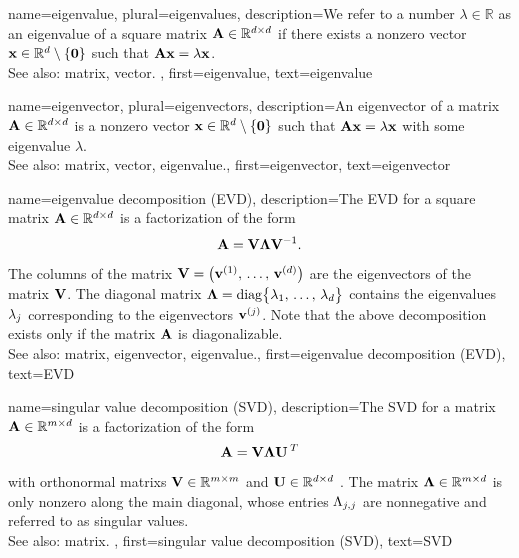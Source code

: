 {name={eigenvalue}, plural={eigenvalues}, 
	description={We refer to a 
		number $\lambda \in \mathbb{R}$ as an eigenvalue of a square \gls{matrix} $\mathbf{A} \in \mathbb{R}^{d \times d}$ 
		if there exists a nonzero \gls{vector} ${\bf x} \in \mathbb{R}^{d} \setminus \{ \mathbf{0} \}$ such that $\mathbf{A} {\bf x} = \lambda {\bf x}$.
		\\
		See also: \gls{matrix}, \gls{vector}. },
	first={eigenvalue},
	text={eigenvalue} 
}
	
{name={eigenvector}, plural={eigenvectors}, 
	description={An 
		eigenvector of a \gls{matrix} $\mathbf{A} \in \mathbb{R}^{d \times d}$ 
		is a nonzero \gls{vector} ${\bf x} \in \mathbb{R}^{d} \setminus \{ \mathbf{0} \}$ 
		such that $\mathbf{A} {\bf x} = \lambda {\bf x}$ with some \gls{eigenvalue} $\lambda$.
				\\
		See also: \gls{matrix}, \gls{vector}, \gls{eigenvalue}.},
	first={eigenvector},
	text={eigenvector} 
}

{name={eigenvalue decomposition (EVD)}, 
	description={The EVD
		for a square \gls{matrix} ${\bf A} \in \mathbb{R}^{d \times d}$ 
		is a factorization of the form 
		$${\bf A} = \mathbf{V} {\bm \Lambda} \mathbf{V}^{-1}.$$ 
		The columns of the \gls{matrix} $\mathbf{V} = \big( {\bf v}^{(1)}, \,\ldots, \,{\bf v}^{(d)} \big)$ are the 
		\glspl{eigenvector} of the \gls{matrix} $\mathbf{V}$. The diagonal \gls{matrix} 
		${\bm \Lambda} = {\rm diag} \big\{ \lambda_{1}, \,\ldots, \,\lambda_{d} \big\}$ 
		contains the \glspl{eigenvalue} $\lambda_{j}$ corresponding to the \glspl{eigenvector} ${\bf v}^{(j)}$. 
		Note that the above decomposition exists only if the \gls{matrix} ${\bf A}$ is diagonalizable.
				\\
		See also: \gls{matrix}, \gls{eigenvector}, \gls{eigenvalue}.},
	first={eigenvalue decomposition (EVD)},
	text={EVD} 
}

{name={singular value decomposition (SVD)}, 
  	description={The SVD  
  		for a \gls{matrix} ${\bf A} \in \mathbb{R}^{m \times d}$ 
		is a factorization of the form 
		$${\bf A} = \mathbf{V} {\bm \Lambda} \mathbf{U}\,^{T}$$ 
		with orthonormal \glspl{matrix} $\mathbf{V} \in \mathbb{R}^{m \times m}$ 
		and $\mathbf{U} \in \mathbb{R}^{d \times d}$ \cite{GolubVanLoanBook}. 
		The \gls{matrix} ${\bm \Lambda} \in \mathbb{R}^{m \times d}$ is 
		only nonzero along the main diagonal, whose entries $\Lambda_{j,j}$ 
		are nonnegative and referred to as singular values.
		\\
		See also: \gls{matrix}. },
	first={singular value decomposition (SVD)},
	text={SVD} 
}


